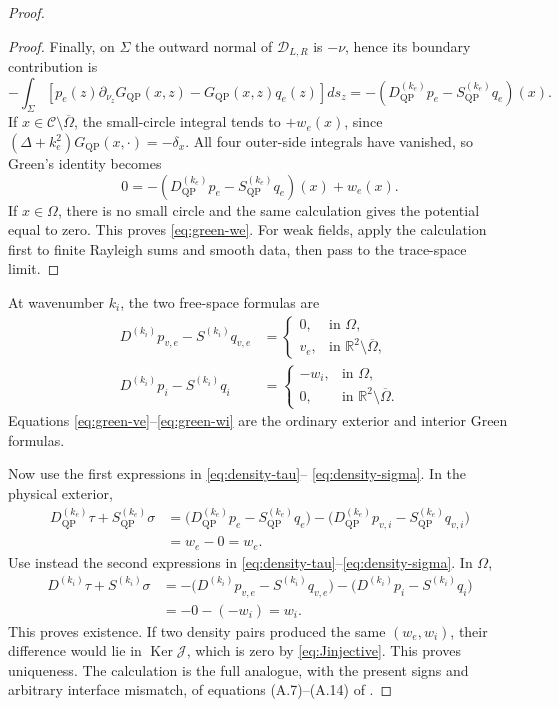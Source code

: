 \documentclass[11pt]{article}
\newcommand{\C}{\mathcal C}
\newcommand{\Om}{\Omega}
\newcommand{\Sig}{\Sigma}
\newcommand{\R}{\mathbb R}
\newcommand{\QP}{\mathrm{QP}}
\newcommand{\Ker}{\operatorname{Ker}}
\theoremstyle{plain}
\theoremstyle{definition}
\theoremstyle{remark}
\begin{document}
\begin{proof}
\begin{proof}
Finally, on \(\Sig\) the outward normal of \(\mathcal D_{L,R}\) is
\(-\nu\), hence its boundary contribution is
\[
-\int_\Sig\left[p_e(z)\partial_{\nu_z}G_{\QP}(x,z)
                 -G_{\QP}(x,z)q_e(z)\right]ds_z
=-\left(D_{\QP}^{(k_e)}p_e-S_{\QP}^{(k_e)}q_e\right)(x).
\]
If \(x\in\C\setminus\overline\Om\), the small-circle integral tends to
\(+w_e(x)\), since \((\Delta+k_e^2)G_{\QP}(x,\cdot)=-\delta_x\).  All four
outer-side integrals have vanished, so Green's identity becomes
\[
0=-\left(D_{\QP}^{(k_e)}p_e-S_{\QP}^{(k_e)}q_e\right)(x)+w_e(x).
\]
If \(x\in\Om\), there is no small circle and the same calculation gives the
potential equal to zero.  This proves \eqref{eq:green-we}.  For weak fields,
apply the calculation first to finite Rayleigh sums and smooth data, then pass
to the trace-space limit.
\end{proof}

At wavenumber \(k_i\), the two free-space formulas are
\begin{align}
D^{(k_i)}p_{v,e}-S^{(k_i)}q_{v,e}
&=\begin{cases}0,&\text{in }\Om,\\v_e,&\text{in }\R^2\setminus\overline\Om,
\end{cases}\label{eq:green-ve}\\
D^{(k_i)}p_i-S^{(k_i)}q_i
&=\begin{cases}-w_i,&\text{in }\Om,\\0,&\text{in }\R^2\setminus\overline\Om.
\end{cases}\label{eq:green-wi}
\end{align}
Equations \eqref{eq:green-ve}--\eqref{eq:green-wi} are the ordinary exterior
and interior Green formulas.

Now use the first expressions in \eqref{eq:density-tau}--
\eqref{eq:density-sigma}.  In the physical exterior,
\begin{equation}
\begin{aligned}
D_{\QP}^{(k_e)}\tau+S_{\QP}^{(k_e)}\sigma
&=\bigl(D_{\QP}^{(k_e)}p_e-S_{\QP}^{(k_e)}q_e\bigr)
 -\bigl(D_{\QP}^{(k_e)}p_{v,i}-S_{\QP}^{(k_e)}q_{v,i}\bigr)\\
&=w_e-0=w_e.
\end{aligned}
\label{eq:verify-we}
\end{equation}
Use instead the second expressions in
\eqref{eq:density-tau}--\eqref{eq:density-sigma}.  In \(\Om\),
\begin{equation}
\begin{aligned}
D^{(k_i)}\tau+S^{(k_i)}\sigma
&=-\bigl(D^{(k_i)}p_{v,e}-S^{(k_i)}q_{v,e}\bigr)
 -\bigl(D^{(k_i)}p_i-S^{(k_i)}q_i\bigr)\\
&=-0-(-w_i)=w_i.
\end{aligned}
\label{eq:verify-wi}
\end{equation}
This proves existence.  If two density pairs produced the same
\((w_e,w_i)\), their difference would lie in \(\Ker\mathcal J\), which is
zero by \eqref{eq:Jinjective}.  This proves uniqueness.  The calculation is
the full analogue, with the present signs and arbitrary interface mismatch,
of equations (A.7)--(A.14) of \cite{BarnettGreengard2010}.
\end{proof}
\end{document}
